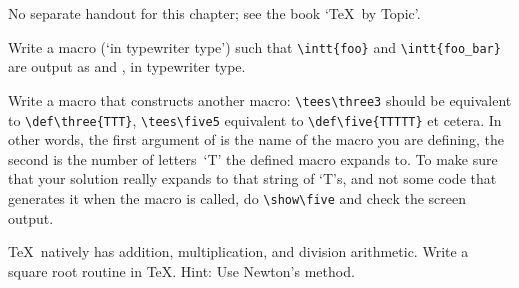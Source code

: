 No separate handout for this chapter; see the book `\TeX\ by Topic'.

\begin{594exercise}
Write a macro  (`in typewriter type')
such that \verb+\intt{foo}+ and
\verb+\intt{foo_bar}+ are output as  and ,
 in typewriter type. 
\end{594exercise}
\begin{answer}
\end{answer}

\begin{594exercise}
Write a macro that constructs another macro: \verb+\tees\three3+
should be equivalent to \verb+\def\three{TTT}+, \verb+\tees\five5+
equivalent to \verb+\def\five{TTTTT}+ et cetera. In other words, the
first argument of  is the name of the macro you are defining,
the second is the number of letters~`T' the defined macro expands to.
To make sure that your solution really expands to that string of `T's,
and not some code that generates it when the macro is called, 
do \verb+\show\five+ and check the screen output.
\end{594exercise}
\begin{answer}
\end{answer}

\begin{594exercise}
\TeX\ natively has addition, multiplication, and division arithmetic. 
Write a square root routine in \TeX. Hint: Use Newton's method.
\end{594exercise}

